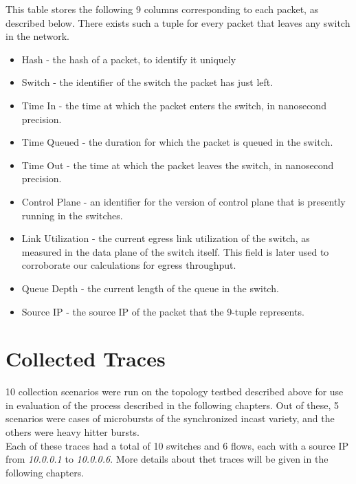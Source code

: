 This table stores the following 9 columns corresponding to each packet,
as described below. There exists such a tuple for every packet that leaves any switch in the network.
\begin{itemize}
	\item Hash - the hash of a packet, to identify it uniquely
	\item Switch - the identifier of the switch the packet has just left.
	\item Time In - the time at which the packet enters the switch, in nanosecond precision.
	\item Time Queued - the duration for which the packet is queued in the switch.
	\item Time Out - the time at which the packet leaves the switch, in nanosecond precision.
	\item Control Plane - an identifier for the version of control plane that is presently running in the switches.
	\item Link Utilization - the current egress link utilization of the switch, as measured in the data plane of the switch itself.
	This field is later used to corroborate our calculations for egress throughput.
	\item Queue Depth - the current length of the queue in the switch.
	\item Source IP - the source IP of the packet that the 9-tuple represents.
\end{itemize}

\section{Collected Traces}

10 collection scenarios were run on the topology testbed described above for use in evaluation of the process described in the following chapters.
Out of these, 5 scenarios were cases of microbursts of the synchronized incast variety, and the others were heavy hitter bursts.
\\
Each of these traces had a total of 10 switches and 6 flows, each with a source IP from \emph{10.0.0.1} to \emph{10.0.0.6}.
More details about thet traces will be given in the following chapters.
